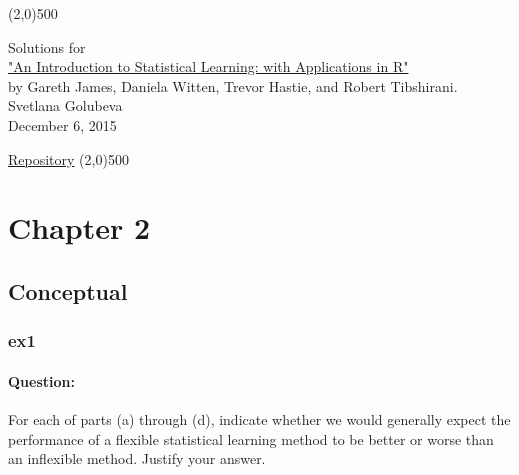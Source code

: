\documentclass[a4paper,12pt,titlepage]{article} %
\begin{document}
\begin{titlepage}

\begin{center}
	\line(2,0){500}
\end{center}

\vspace{60pt}

\begin{center}	
	{\Large{Solutions for}}\\
	\vspace{20pt}
	\href{http://www.springer.com/us/book/9781461471370}{\Huge{"An Introduction to Statistical Learning: with Applications in R"}}\\
	\vspace{20pt}
	{\LARGE{by Gareth James, Daniela Witten, Trevor Hastie, and Robert Tibshirani.}}\\
	\vspace{20pt}
	Svetlana Golubeva\\
	\vspace{20pt}
	December 6, 2015
\end{center}

\vspace{\fill}
\begin{center}
	\href{https://github.com/attillax/ISL}{Repository}
	\line(2,0){500}
\end{center}

\end{titlepage}

\tableofcontents

\newpage
\section{Chapter 2}
\subsection{Conceptual}
\subsubsection{ex1}
\paragraph{Question:} For each of parts (a) through (d), indicate whether we would generally expect the performance of a flexible statistical learning method to be better or worse than an inflexible method. Justify your answer.
\end{document}
